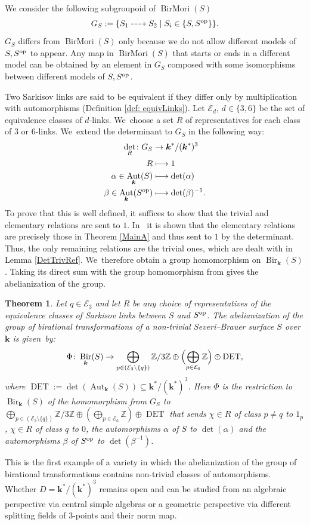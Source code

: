 \documentclass[JEP,XML,SOM,Unicode,NoFloatCountersInSection, NoEqCountersInSection,published]{cedram}
\newcommand{\dradpl}{{\hspace*{-2mm}\begin{tikzcd}[ampersand replacement=\&,column sep = scriptsize]\mbox{}\ar[r,dashed]\&\mbox{}\end{tikzcd}\hspace*{-2mm}}}
\newcommand{\dratst}{{\hspace*{-2.5mm}\begin{tikzcd}[ampersand replacement=\&,column sep = small]\mbox{}\ar[r,dashed]\&\mbox{}\end{tikzcd}\hspace*{-2mm}}}
\let\drascst\dratst
\newcommand{\dra}{\mathchoice{\dradpl}{\dratst}{\drascst}{\drascst}}
\newcommand\mto{\mathchoice{\longmapsto}{\mapsto}{\mapsto}{\mapsto}}
\newcommand{\op}{\textup{op}}
\DeclareMathOperator{\DET}{DET}
\newtheorem{maintheorem}{Theorem}
\theoremstyle{definition}
\newcommand{\kk}{{\boldsymbol{k}}}
\DeclareMathOperator{\Bir}{Bir}
\DeclareMathOperator{\Aut}{Aut}
\DeclareMathOperator{\BirMori}{BirMori}
\begin{document}
We consider the following subgroupoid of $\BirMori(S)$
\[
G_S := \{ S_1 \dra S_2 \mid S_i \in \{ S, S^{\op}\}\}.
\]
$G_S$ differs from $\BirMori(S)$ only because we do not allow different models of $S,S^{\op}$ to appear. Any map in $\BirMori(S)$ that starts or ends in a different model can be obtained by an element in $G_S$ composed with some isomorphisms between different models of $S,S^{\op}$.

Two Sarkisov links are said to be equivalent if they differ only by multiplication with automorphisms (\cf Definition \ref{def: equivLinks}). Let $\mathcal{E}_d$, $d \in \{3,6\}$ be the set of equivalence classes of $d$-links. We~choose a set $R$ of representatives for each class of $3$ or $6$\nobreakdash-links. We~extend the determinant to $G_S$ in the following way:
\begin{align*}
\det_R\colon G_S &\to \kk^*/(\kk^*)^3
\\
R &\mto 1
\\
\alpha \in \Aut_{\kk}(S) &\mto \det(\alpha)
\\
\beta \in \Aut_{\kk}(S^{\op})&\mto \det(\beta)^{-1}.
\end{align*}
To prove that this is well defined, it suffices to show that the trivial and elementary relations are sent to $1$. In~\cite[Lem.\,3.3.4]{BSY} it is shown that the elementary relations are precisely those in Theorem \ref{MainA} and thus sent to $1$ by the determinant. Thus, the only remaining relations are the trivial ones, which are dealt with in Lemma \ref{DetTrivRef}. We~therefore obtain a group homomorphism on $\Bir_{\kk}(S)$. Taking its direct sum with the group homomorphism from \cite{BSY} gives the abelianization of the group.

\begin{maintheorem} \label{MainB}
Let $q \in \mathcal{E}_3$ and let $R$ be any choice of representatives of the equivalence classes of Sarkisov links between $S$ and $S^{\op}$. The abelianization of the group of birational transformations of a non-trivial Severi--Brauer surface $S$ over $\kk$ is given~by:
\[
\Phi\colon\Bir_{\kk}(S) \to \bigoplus_{p \in (\mathcal{E}_3 \setminus \{ q \})} \mathbb{Z}/3\mathbb{Z} \oplus \Bigl(\bigoplus_{p \in \mathcal{E}_6} \mathbb{Z}\Bigr) \oplus \DET,
\]
where $\DET := \det(\Aut_{\kk}(S)) \subseteq \kk^* / (\kk^*)^3$. Here $\Phi$ is the restriction to $\Bir_{\kk}(S)$ of the homomorphism from $G_S$ to $\bigoplus_{p \in (\mathcal{E}_3 \setminus \{ q \})} \mathbb{Z}/3\mathbb{Z} \oplus (\bigoplus_{p \in \mathcal{E}_6} \mathbb{Z}) \oplus \DET$ that sends $\chi \in R$ of class $p \neq q$ to $1_p$, $\chi \in R$ of class $q$ to $0$, the automorphisms $\alpha$ of $S$ to $\det(\alpha)$ and the automorphisms $\beta$ of $S^{\op}$ to $\det(\beta^{-1})$.
\end{maintheorem}
This is the first example of a variety in which the abelianization of the group of birational transformations contains non-trivial classes of automorphisms. Whether $D = \kk^*/(\kk^*)^3$ remains open and can be studied from an algebraic perspective via central simple algebras or a geometric perspective via different splitting fields of $3$\nobreakdash-points and their norm map.
\end{document}
